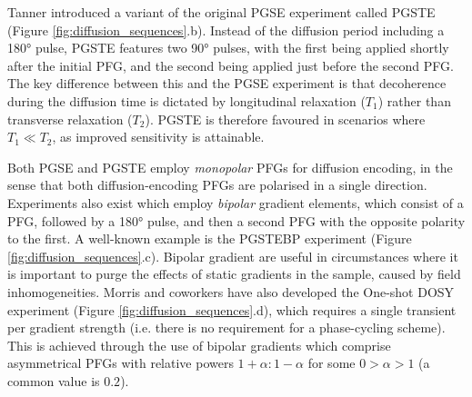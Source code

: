 Tanner introduced a variant of the original \ac{PGSE} experiment called
\ac{PGSTE}\cite{Tanner1970} (Figure \ref{fig:diffusion_sequences}.b). Instead
of the diffusion period including a
\ang{180} pulse, \ac{PGSTE} features two \ang{90} pulses, with the first being
applied shortly after the initial \ac{PFG}, and the second being applied just
before the second \ac{PFG}. The key difference between this and the \ac{PGSE}
experiment is that decoherence during the diffusion time is
dictated by longitudinal relaxation ($T_1$) rather than transverse relaxation
($T_2$). \ac{PGSTE} is therefore favoured in scenarios where $T_1 \ll T_2$, as
improved sensitivity is attainable.


Both \ac{PGSE} and \ac{PGSTE} employ \emph{monopolar} \acp{PFG} for diffusion
encoding, in the sense that both diffusion-encoding \acp{PFG} are polarised in a
single direction. Experiments also exist which employ
\emph{bipolar} gradient elements\cite{Cotts1989,Wu1995}, which consist of a
\ac{PFG}, followed by a \ang{180} pulse, and then a second \ac{PFG} with the
opposite polarity to the first. A well-known example is the \ac{PGSTEBP}
experiment (Figure \ref{fig:diffusion_sequences}.c). Bipolar gradient are
useful in circumstances where it is important to purge the effects of static
gradients in the sample, caused by field inhomogeneities. Morris and coworkers
have also developed the One-shot DOSY experiment\cite{Pelta2002} (Figure
\ref{fig:diffusion_sequences}.d), which requires a single transient per
gradient strength (i.e. there is no requirement for a phase-cycling scheme).
This is achieved through the use of bipolar gradients which comprise
asymmetrical \acp{PFG} with relative powers $1 + \alpha : 1 - \alpha$ for some
$ 0 > \alpha > 1$ (a common value is $0.2$).

